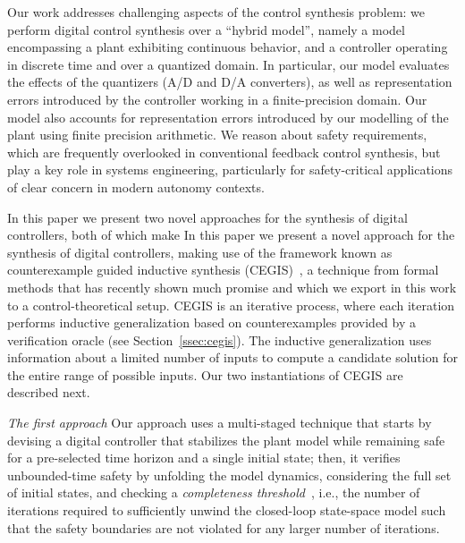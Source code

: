 \documentclass[twocolumn]{autart}    %
\begin{document}
Our work addresses challenging aspects of the control synthesis problem:  
we perform digital control synthesis over a ``hybrid model'',
namely a model encompassing a plant exhibiting continuous behavior, 
and a controller operating in discrete time and over a quantized domain.  
In particular, our model evaluates the effects of the quantizers (A/D and D/A
converters), as well as representation
errors introduced by the controller working  %
in a finite-precision domain. Our model also accounts for representation errors introduced
by our modelling of the plant using finite precision arithmetic. 
We reason about safety requirements, which are frequently overlooked in conventional feedback control synthesis, but
play a key role in systems engineering, particularly for safety-critical applications of clear concern in modern autonomy contexts.  

\ifx\axelerator
In this paper we present two novel approaches for the synthesis of
digital controllers, both of which make 
\else
In this paper we present a novel approach for the synthesis of digital controllers,
making 
\fi
use of the framework known as counterexample guided
inductive synthesis (CEGIS)~\cite{jha-icse10,
  DBLP:conf/asplos/Solar-LezamaTBSS06}, 
  a technique from formal methods that has recently shown much promise and which we 
  export in this work to a control-theoretical setup.  
CEGIS is an iterative process, where each iteration performs inductive
generalization based on counterexamples provided by a verification
oracle (see Section~\ref{ssec:cegis}). The inductive generalization uses information 
about a limited number of inputs to compute a candidate solution
for the entire range of possible inputs. Our two instantiations of CEGIS are described next.

\ifx\axelerator
\emph{The first approach} 
\else
Our approach
\fi
uses a multi-staged technique that starts by devising a
digital controller that stabilizes the plant model while remaining safe for a
pre-selected time horizon and a single initial state; then, it verifies
unbounded-time safety by unfolding the model dynamics, considering the 
full set of initial states, and checking a \emph{completeness
threshold}~\cite{DBLP:conf/vmcai/KroeningS03}, i.e., the number of
iterations required to sufficiently unwind the closed-loop state-space
model such that the safety boundaries are not violated for any larger number of
iterations.  
\end{document}
